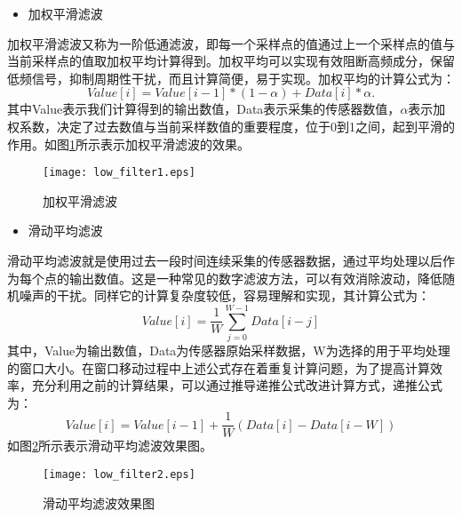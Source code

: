 \begin{itemize}
	\item 加权平滑滤波
\end{itemize}
\par 加权平滑滤波又称为一阶低通滤波，即每一个采样点的值通过上一个采样点的值与当前采样点的值取加权平均计算得到。加权平均可以实现有效阻断高频成分，保留低频信号，抑制周期性干扰，而且计算简便，易于实现。加权平均的计算公式为：
\begin{equation}
	Value[i] = Value[i-1]*(1-\alpha) + Data[i]*\alpha.
\end{equation}
其中Value表示我们计算得到的输出数值，Data表示采集的传感器数值，$\alpha$表示加权系数，决定了过去数值与当前采样数值的重要程度，位于0到1之间，起到平滑的作用。如图\ref{low_filter1}所示表示加权平滑滤波的效果。
\begin{figure}[htb]
\centering
\texttt{[image: low\_filter1.eps]}
\caption{加权平滑滤波} \label{low_filter1}
\end{figure}


\begin{itemize}
	\item 滑动平均滤波
\end{itemize}

\par 滑动平均滤波就是使用过去一段时间连续采集的传感器数据，通过平均处理以后作为每个点的输出数值。这是一种常见的数字滤波方法，可以有效消除波动，降低随机噪声的干扰。同样它的计算复杂度较低，容易理解和实现，其计算公式为：
\begin{equation}
	Value[i] = \frac{1}{W}\sum_{j=0}^{W-1}Data[i-j]
\end{equation}
其中，Value为输出数值，Data为传感器原始采样数据，W为选择的用于平均处理的窗口大小。在窗口移动过程中上述公式存在着重复计算问题，为了提高计算效率，充分利用之前的计算结果，可以通过推导递推公式改进计算方式，递推公式为：
\begin{equation}
	Value[i] = Value[i-1] + \frac{1}{W}(Data[i] - Data[i-W])
\end{equation}
如图\ref{low_filter2}所示表示滑动平均滤波效果图。
\begin{figure}[htb]
\centering
\texttt{[image: low\_filter2.eps]}
\caption{滑动平均滤波效果图}\label{low_filter2}
\end{figure}

